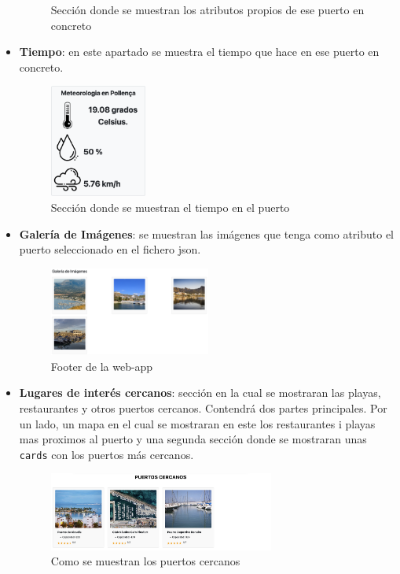 \documentclass{article}
\begin{document}
\begin{itemize}
\begin{figure}[ht]
        \caption{Sección donde se muestran los atributos propios de ese puerto en concreto}
    \end{figure}
    \newpage
    \item \textbf{Tiempo}: en este apartado se muestra el tiempo que hace en ese puerto en concreto.
    \begin{figure}[ht]
        \centering
        \includegraphics[width=0.3\textwidth]{images/tiempo.png}
        \caption{Sección donde se muestran el tiempo en el puerto}
    \end{figure}
    \item \textbf{Galería de Imágenes}: se muestran las imágenes que tenga como atributo el puerto seleccionado en el fichero json.
    \begin{figure}[ht]
        \centering
        \includegraphics[width=0.5\textwidth]{images/galeriaImg.png}
        \caption{Footer de la web-app}
    \end{figure}
    \item \textbf{Lugares de interés cercanos}: sección en la cual se mostraran las playas, restaurantes y otros puertos cercanos. Contendrá dos partes principales. Por un lado, un mapa en el cual se mostraran en este los restaurantes i playas mas proximos al puerto y una segunda sección donde se mostraran unas \texttt{cards} con los puertos más cercanos.
    \begin{figure}[ht]
        \centering
        \includegraphics[width=0.7\textwidth]{images/puertosCercanos.png}
        \caption{Como se muestran los puertos cercanos}
    \end{figure}
\end{itemize}
\end{document}
